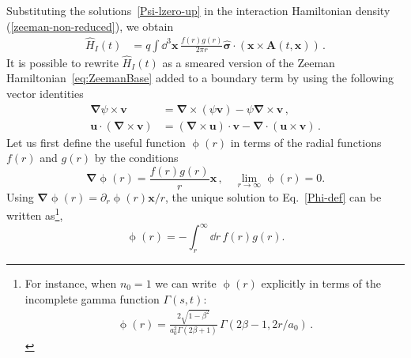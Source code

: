\documentclass[letterpaper,12pt,titlepage,oneside,final]{book}
\begin{document}
Substituting the solutions~\eqref{Psi-lzero-up} in the interaction Hamiltonian density (\ref{zeeman-non-reduced}), we obtain
\begin{align}\label{H-interaction-simple}
    \hat{H}_I(t) &=  q \int \dd^3\bm x\, \frac{f(r)g(r)}{2\pi r}\hat{\bm{\sigma}}\cdot(\bm{x}\times \bm{A}(t, \bm{x}))\, .
\end{align}
It is possible to rewrite $\hat{H}_I(t)$ as a smeared version of the Zeeman Hamiltonian~\eqref{eq:ZeemanBase} added to a boundary term by using the following vector identities 
\begin{align}
    \bm \nabla \psi {\times} \bm{v} &= \bm \nabla \times (\psi \bm{v} ) - \psi \bm \nabla {\times} \bm{v} \label{prop2}\, ,\\
    \bm u \cdot (\bm \nabla\times \bm v) & = (\bm \nabla \times \bm u) \cdot \bm v - \bm \nabla \cdot( \bm u \times \bm v) \label{prop3}\, .
\end{align}
Let us first define the useful function $\upphi(r)$ in terms of the radial functions $f(r)$ and $g(r)$ by the conditions
\begin{equation}\label{Phi-def}
    \bm{\nabla}\upphi(r) = \frac{f(r)g(r)}{r}\bm{x}\, ,\quad \lim_{r\to\infty} \upphi(r) = 0.
\end{equation}
Using $\bm \nabla \upphi(r) = \partial_r\upphi(r)\bm{x}/r$, the unique solution to Eq.~\eqref{Phi-def} can be written as\footnote{For instance, when $n_0 = 1$ we can write $\upphi(r)$ explicitly in terms of the incomplete gamma function $\Gamma(s,t)$: 
\begin{align}\label{Phi}
    \upphi(r) = \frac{2\sqrt{1-\beta^2}}{a_0^2 \Gamma(2\beta+1)} \, \Gamma(2\beta - 1, 2r/a_0) \, .
\end{align}},
\begin{equation}\label{eq:phir}
    \upphi(r) = -\int_r^\infty \dd r\, f(r)g(r) .
\end{equation}
\end{document}
